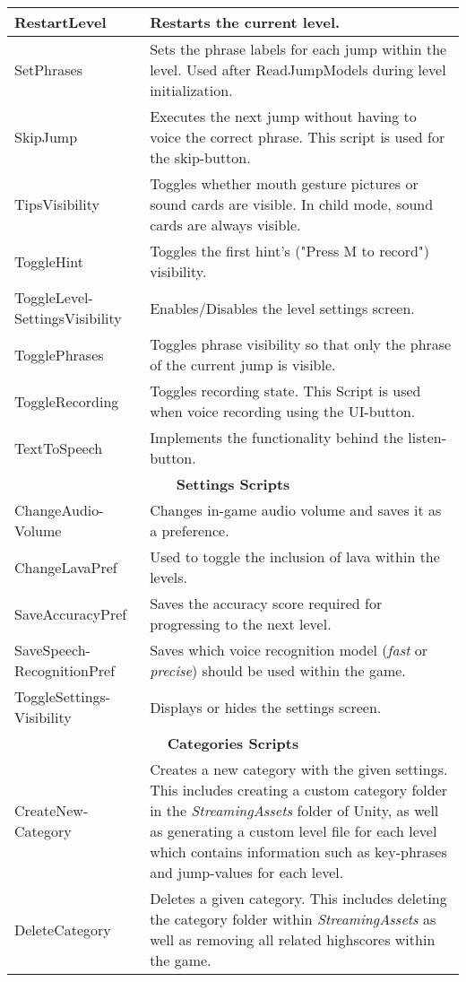\documentclass[draft,final]{vutinfth} %
\begin{document}
\begin{longtable}[h]{|p{}|p{}|}
RestartLevel & Restarts the current level. \\ \hline
SetPhrases & Sets the phrase labels for each jump within the level. Used after ReadJumpModels during level initialization. \\ \hline
SkipJump & Executes the next jump without having to voice the correct phrase. This script is used for the skip-button. \\ \hline
TipsVisibility & Toggles whether mouth gesture pictures or sound cards are visible. In child mode, sound cards are  always visible. \\ \hline
ToggleHint & Toggles the first hint's ("Press M to record") visibility. \\ \hline
ToggleLevel-SettingsVisibility & Enables/Disables the level settings screen. \\ \hline
TogglePhrases & Toggles phrase visibility so that only the phrase of the current jump is visible. \\ \hline
ToggleRecording & Toggles recording state. This Script is used when voice recording using the UI-button. \\ \hline
TextToSpeech & Implements the functionality behind the listen-button. \\ \hline
\multicolumn{2}{|c|}{\textbf{Settings Scripts}} \\ \hline
ChangeAudio-Volume & Changes in-game audio volume and saves it as a preference. \\ \hline
ChangeLavaPref & Used to toggle the inclusion of lava within the levels. \\ \hline
SaveAccuracyPref & Saves the accuracy score required for progressing to the next level. \\ \hline
SaveSpeech-RecognitionPref & Saves which voice recognition model (\emph{fast} or \emph{precise}) should be used within the game. \\ \hline
ToggleSettings-Visibility & Displays or hides the settings screen. \\ \hline
\multicolumn{2}{|c|}{\textbf{Categories Scripts}} \\ \hline
CreateNew-Category & Creates a new category with the given settings. This includes creating a custom category folder in the \emph{StreamingAssets} folder of Unity, as well as generating a custom level file for each level which contains information such as key-phrases and jump-values for each level. \\ \hline
DeleteCategory & Deletes a given category. This includes deleting the category folder within \emph{StreamingAssets} as well as removing all related highscores within the game. \\ \hline

\end{longtable}
\end{document}
